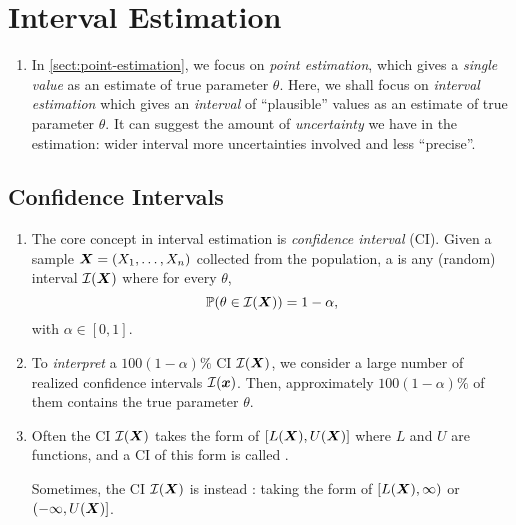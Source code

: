 \section{Interval Estimation}
\label{sect:interval-estimation}
\begin{enumerate}
\item In \cref{sect:point-estimation}, we focus on \emph{point estimation},
which gives a \emph{single value} as an estimate of true parameter \(\theta\).
Here, we shall focus on \emph{interval estimation} which gives an
\emph{interval} of ``plausible'' values as an estimate of true parameter
\(\theta\). It can suggest the amount of \emph{uncertainty} we have in the
estimation: wider interval  more uncertainties involved and
less ``precise''.
\end{enumerate}
\subsection{Confidence Intervals}
\begin{enumerate}
\item The core concept in interval estimation is \emph{confidence interval} (CI).
Given a sample \(\vb*{X}=(X_1,\dotsc,X_n)\) collected from the population, a
 is any (random)
interval \(\mathcal{I}(\vb*{X})\) where for every \(\theta\),
\[
\mathbb{P}\qty(\theta\in\mathcal{I}(\vb*{X}))=1-\alpha,
\]
with \(\alpha\in[0,1]\).

\item To \emph{interpret} a \(100(1-\alpha)\%\) CI \(\mathcal{I}(\vb*{X})\),
we consider a large number of realized confidence intervals
\(\mathcal{I}(\vb*{x})\). Then, approximately \(100(1-\alpha)\%\) of them
contains the true parameter \(\theta\).

\item Often the CI \(\mathcal{I}(\vb*{X})\) takes the form of
\([L(\vb*{X}),U(\vb*{X})]\) where \(L\) and \(U\) are functions, and a
CI of this form is called .

Sometimes, the CI \(\mathcal{I}(\vb*{X})\) is instead : taking
the form of \([L(\vb*{X}),\infty)\) or \((-\infty,U(\vb*{X})]\).
\end{enumerate}
